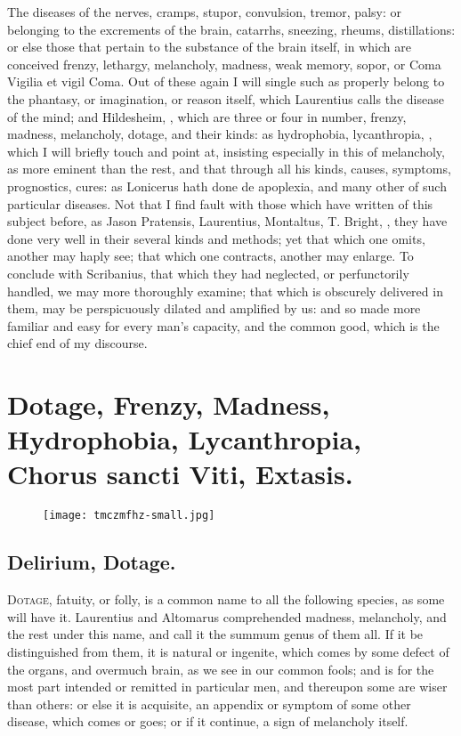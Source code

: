 {The diseases of the nerves, cramps, stupor, convulsion, tremor, palsy:
or belonging to the excrements of the brain, catarrhs, sneezing,
rheums, distillations: or else those that pertain to the substance of
the brain itself, in which are conceived frenzy, lethargy, melancholy,
madness, weak memory, sopor, or Coma Vigilia et vigil Coma. Out of
these again I will single such as properly belong to the phantasy, or
imagination, or reason itself, which Laurentius calls the disease
of the mind; and Hildesheim, ,
 which are three or four in number, frenzy, madness, melancholy, dotage, and their kinds:
as hydrophobia, lycanthropia, , which I will briefly touch
and point at, insisting especially in this of melancholy, as more
eminent than the rest, and that through all his kinds, causes,
symptoms, prognostics, cures: as Lonicerus hath done de apoplexia, and
many other of such particular diseases. Not that I find fault with
those which have written of this subject before, as Jason Pratensis,
Laurentius, Montaltus, T. Bright, \etc{}, they have done very well in
their several kinds and methods; yet that which one omits, another may
haply see; that which one contracts, another may enlarge. To conclude
with Scribanius, that which they had neglected, or perfunctorily
handled, we may more thoroughly examine; that which is obscurely
delivered in them, may be perspicuously dilated and amplified by us:
and so made more familiar and easy for every man's capacity, and the
common good, which is the chief end of my discourse.

\section[Madness]{Dotage, Frenzy, Madness, Hydrophobia, Lycanthropia, Chorus sancti Viti, Extasis.}
\begin{figure}[H]
  \begingroup
  \centering
  \texttt{[image: tmczmfhz-small.jpg]}
  \label{fig:madness}
\end{figure}
\subsection{Delirium, Dotage.}
\lettrine{D}{otage}, fatuity, or folly, is a common name to all
the following species, as some will have it. Laurentius and 
Altomarus comprehended madness, melancholy, and the rest under this
name, and call it the summum genus of them all. If it be distinguished
from them, it is natural or ingenite, which comes by some defect of the
organs, and overmuch brain, as we see in our common fools; and is for
the most part intended or remitted in particular men, and thereupon
some are wiser than others: or else it is acquisite, an appendix or
symptom of some other disease, which comes or goes; or if it continue,
a sign of melancholy itself.

}
